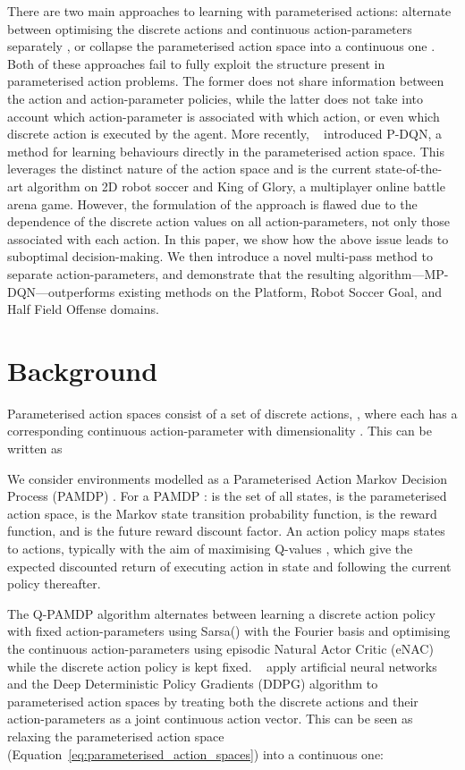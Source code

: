 \documentclass{article}
\def\PDQN*{P\nobreakdash-DQN}
\def\MPDQN*{MP\nobreakdash-DQN}
\def\QPAMDP*{Q\nobreakdash-PAMDP}
\newcommand{\citet}[1]
{\citeauthor{#1}~\shortcite{#1}}
\newcommand{\citep}{\cite}
\begin{document}
There are two main approaches to learning with parameterised actions: alternate between optimising the discrete actions and continuous action-parameters separately \citep{masson2016,khamassi2017}, or collapse the parameterised action space into a continuous one \citep{hausknecht2016}. Both of these approaches fail to fully exploit the structure present in parameterised action problems. The former does not share information between the action and action-parameter policies, while the latter does not take into account which action-parameter is associated with which action, or even which discrete action is executed by the agent. More recently, \citet{xiong2018} introduced \PDQN*, a method for learning behaviours directly in the parameterised action space. This leverages the distinct nature of the action space and is the current state-of-the-art algorithm on 2D robot soccer and King of Glory, a multiplayer online battle arena game. However, the formulation of the approach is flawed due to the dependence of the discrete action values on all action-parameters, not only those associated with each action. In this paper, we show how the above issue leads to suboptimal decision-making. We then introduce a novel multi-pass method to separate action-parameters, and demonstrate that the resulting algorithm---\MPDQN*---outperforms existing methods on the Platform, Robot Soccer Goal, and Half Field Offense domains.

\section{Background}

Parameterised action spaces \citep{masson2016} consist of a set of discrete actions, , where each  has a corresponding continuous action-parameter \mbox{} with dimensionality . This can be written as

We consider environments modelled as a Parameterised Action Markov Decision Process (PAMDP) \cite{masson2016}. For a PAMDP \mbox{}:  is the set of all states,  is the parameterised action space,  is the Markov state transition probability function,  is the reward function, and  is the future reward discount factor. An action policy  maps states to actions, typically with the aim of maximising Q-values , which give the expected discounted return of executing action   in state  and following the current policy thereafter. 

The \QPAMDP* algorithm \citep{masson2016} alternates between learning a discrete action policy with fixed action-parameters using Sarsa() \citep{sutton1998} with the Fourier basis \citep{konidaris2011} and optimising the continuous action-parameters using episodic Natural Actor Critic (eNAC) \citep{peters2005} while the discrete action policy is kept fixed.
\citet{hausknecht2016} apply artificial neural networks and the Deep Deterministic Policy Gradients (DDPG) algorithm \citep{lillicrap2015} to parameterised action spaces by treating both the discrete actions and their action-parameters as a joint continuous action vector. This can be seen as relaxing the parameterised action space (Equation~\ref{eq:parameterised_action_spaces}) 
into a continuous one:
\end{document}
